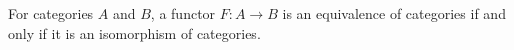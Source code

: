\documentclass[hott-all.tex]{subfiles}
\begin{document}

\begin{lem}
  For categories $A$ and $B$, a functor $F:A\to B$ is an equivalence of categories if and only if it is an isomorphism of categories.
\end{lem}
%
%
\end{document}
